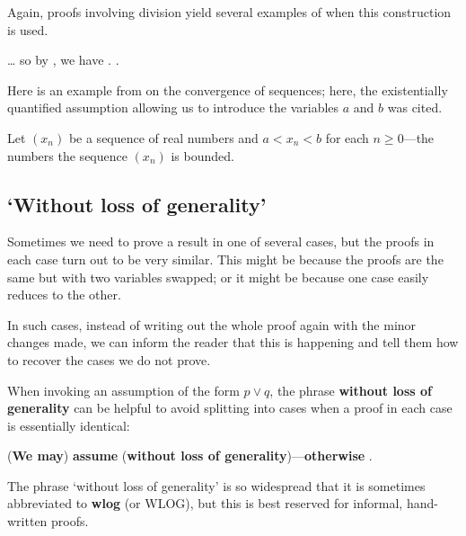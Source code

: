 Again, proofs involving division yield several examples of when this construction is used.

\begin{extract}
\label{xtrIntroducingExistentialVariableExample}
\dots{} so by , we have .  .
\end{extract}

Here is an example from  on the convergence of sequences; here, the existentially quantified assumption allowing us to introduce the variables $a$ and $b$ was cited.

\begin{extract}
\label{xtrIntroducingVariablesExistentialExampleTwo}
Let $(x_n)$ be a sequence of real numbers and  $a < x_n < b$ for each $n \ge 0$---the numbers  the sequence $(x_n)$ is bounded.
\end{extract}

\subsection*{`Without loss of generality'}

Sometimes we need to prove a result in one of several cases, but the proofs in each case turn out to be very similar. This might be because the proofs are the same but with two variables swapped; or it might be because one case easily reduces to the other.

In such cases, instead of writing out the whole proof again with the minor changes made, we can inform the reader that this is happening and tell them how to recover the cases we do not prove.

\begin{vocabulary}
\label{vcbWlog}
When invoking an assumption of the form $p \vee q$, the phrase \textbf{without loss of generality} can be helpful to avoid splitting into cases when a proof in each case is essentially identical:

\begin{vocabtemplate}
(\textbf{We may}) \textbf{assume}  (\textbf{without loss of generality})---\textbf{otherwise} .
\end{vocabtemplate}

The phrase `without loss of generality' is so widespread that it is sometimes abbreviated to \textbf{wlog} (or WLOG), but this is best reserved for informal, hand-written proofs.
\end{vocabulary}

